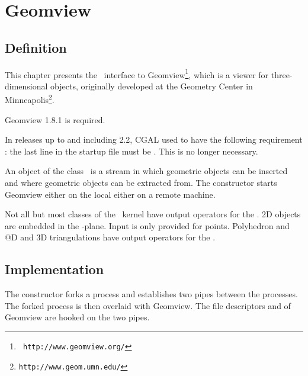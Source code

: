 



\newcommand{\note}[1]{{\bf NOTE: #1}}

\chapter{Geomview} \label{ChapterGeomview}


\section{Definition}

This chapter presents the \cgal\ interface to Geomview\footnote{\tt
http://www.geomview.org/}, which is a
viewer for three-dimensional objects, originally developed at the Geometry
Center in Minneapolis\footnote{\tt http://www.geom.umn.edu/}.

Geomview 1.8.1 is required.

 In releases up to and including 2.2, CGAL used to have
the following requirement : the last line in the startup file 
must be .  This is no longer necessary.


An object of the class \ is a stream in which geometric
objects can be inserted and where geometric objects can be extracted
from. The constructor starts Geomview either on the local either on
a remote machine.



Not all but most classes of the \cgal\ kernel have output
operators for the  . 
2D objects are embedded in the -plane.
Input is only provided for points.
Polyhedron and @D and 3D triangulations  have output
operators for the  . 


\section{Implementation}

The constructor forks a process and establishes two pipes between the
processes. The forked process is then overlaid with Geomview. The
file descriptors  and  of Geomview are hooked
on the two pipes.

